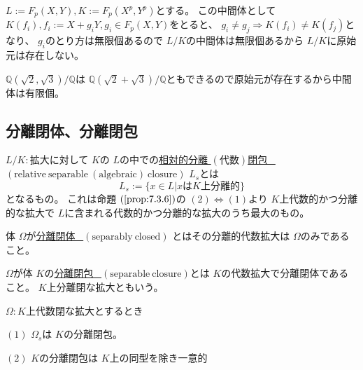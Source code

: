 \documentclass[../master_galois_theory]{subfiles}
\begin{document}
\begin{exam}
  $L := F_p(X,Y) , K := F_p(X^p , Y^p)$とする。
  この中間体として $K(f_i) , f_i := X + g_i Y , g_i \in F_p(X,Y)$をとると、
  $g_i \neq g_j \Rightarrow K(f_i) \neq K(f_j)$となり、
  $g_i$のとり方は無限個あるので $L/K$の中間体は無限個あるから
  $L/K$に原始元は存在しない。
\end{exam}

\begin{exam}
  $\mathbb{Q}(\sqrt{2} , \sqrt{3})/\mathbb{Q}$は
  $\mathbb{Q}(\sqrt{2} + \sqrt{3})/\mathbb{Q}$ともできるので原始元が存在するから中間体は有限個。
\end{exam}

\subsection{分離閉体、分離閉包}

\begin{defi}
  $L/K:$拡大に対して $K$の $L$の中での\underline{相対的分離 $(代数)$閉包 \  $(\mathrm{relative \  separable \  (algebraic) \  closure})$} $L_s$とは
  \[
  L_s := \{ x \in L | xは K上分離的 \}
  \]
  となるもの。
  これは命題 $(\mathrm{\ref{prop:7.3.6}})$の $(2) \Leftrightarrow (1)$より $K$上代数的かつ分離的な拡大で
  $L$に含まれる代数的かつ分離的な拡大のうち最大のもの。
\end{defi}

\begin{defi}
  体 $\Omega$が\underline{分離閉体 \  $(\mathrm{separably \  closed})$}
  とはその分離的代数拡大は $\Omega$のみであること。
\end{defi}

\begin{defi}
  $\Omega$が体 $K$の\underline{分離閉包 \  $(\mathrm{separable \  closure})$}とは
  $K$の代数拡大で分離閉体であること。
  $K$上分離閉な拡大ともいう。
\end{defi}

\begin{prop} \label{prop:9.11}
  $\Omega:K$上代数閉な拡大とするとき

  $(1)$
  $\Omega_s$は $K$の分離閉包。

  $(2)$
  $K$の分離閉包は $K$上の同型を除き一意的
\end{prop}
\end{document}
